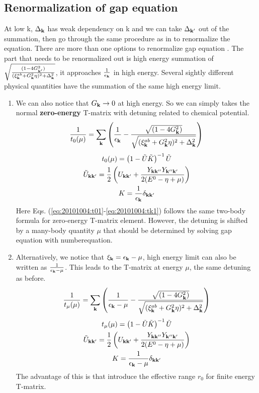 \documentclass{article}
\renewcommand{\emph}[1]{\textbf{#1}}
\begin{document}
\subsection{Renormalization of gap equation}
At low k, $\Delta_{\mathbf{k}}$ has weak dependency on k and we can take $\Delta_{\mathbf{k}'}$ out of the summation,  then go through the same procedure as in \cite{Leggett,Fetter} to renormalize the equation. There are more than one options to renormalize gap equation .  The part that needs to be renormalized out is  high energy summation of $\sqrt{\frac{(1-4G_{\mathbf{k}'}^{2})}{{(\xi^{ab}_{\mathbf{k}}+  G_{\mathbf{k}}^2\eta)^{2}+\Delta_{\mathbf{k}}^{2}}}}$, it approaches $\frac{1}{\epsilon_{\mathbf{k}}}$ in high energy.  Several sightly different physical quantities have the summation of the same high energy limit.  
\begin{enumerate}

\item We can also notice that $G_{\mathbf{k}}\rightarrow0$ at high energy.  So we can simply takes the normal \emph{zero-energy} T-matrix with detuning related to chemical potential.  
\begin{equation}\label{eq:20101004:renormGap1}
\frac{1}{{t_{0}}(\mu)}=\sum_{\mathbf{k}}
\left(\frac{1}{\epsilon_{\mathbf{k}}}-\frac{\sqrt{(1-4G_{\mathbf{k}}^{2})}}{\sqrt{{(\xi^{ab}_{\mathbf{k}}+  G_{\mathbf{k}}^2\eta)^{2}+\Delta_{\mathbf{k}}^{2}}}}\right)
\end{equation} 
\begin{gather}
{t_{0}}(\mu)=\left(1-\tilde{U}\tilde{ K}\right)^{-1}\tilde{U}\label{eq:20101004:t01}\\
\tilde{U}_{\mathbf{k}\mathbf{k}'}=\frac{1}{2} \left(U_{\mathbf{k}\mathbf{k}'}+\frac{Y_{\mathbf{k}\mathbf{k}''}Y_{\mathbf{k}''\mathbf{k}'}}{2(E^{0}-\eta+\mu)}\right)\label{eq:20101004:tu1}\\
{K}=\frac{1}{\epsilon_{\mathbf{k}}}\delta_{\mathbf{k}\mathbf{k}'}\label{eq:20101004:tk1}
\end{gather}
Here Eqs. (\ref{eq:20101004:t01}-\ref{eq:20101004:tk1}) follows the same two-body formula for zero-energy T-matrix element.  However, the detuning is shifted by a many-body quantity $\mu$ that should be determined by solving gap equation with numberequation.    
\item  Alternatively, we notice that $\xi_{\mathbf{k}}=\epsilon_{\mathbf{k}}-\mu$, high energy limit can also be written as 
$\frac{1}{\epsilon_{\mathbf{k}}-\mu}$.  This leads to the T-matrix at energy $\mu$, the same detuning as before.  
\begin{equation}\label{eq:20101004:renormGap2}
\frac{1}{{t_{\mu}}(\mu)}=\sum_{\mathbf{k}}
\left(\frac{1}{\epsilon_{\mathbf{k}}-\mu}-\frac{\sqrt{(1-4G_{\mathbf{k}}^{2})}}{\sqrt{{(\xi^{ab}_{\mathbf{k}}+  G_{\mathbf{k}}^2\eta)^{2}+\Delta_{\mathbf{k}}^{2}}}}\right)
\end{equation} 
\begin{gather}
{t_{\mu}}(\mu)=\left(1-\tilde{U}\tilde{ K}\right)^{-1}\tilde{U}\label{eq:20101004:t02}\\
\tilde{U}_{\mathbf{k}\mathbf{k}'}=\frac{1}{2} \left(U_{\mathbf{k}\mathbf{k}'}+\frac{Y_{\mathbf{k}\mathbf{k}''}Y_{\mathbf{k}''\mathbf{k}'}}{2(E^{0}-\eta+\mu)}\right)\label{eq:20101004:tu2}\\
{K}=\frac{1}{\epsilon_{\mathbf{k}}-\mu}\delta_{\mathbf{k}\mathbf{k}'}\label{eq:20101004:tk2}
\end{gather}
The advantage of this is that introduce the effective range $r_{0}$ for finite energy T-matrix. 
\end{enumerate}
\end{document}
